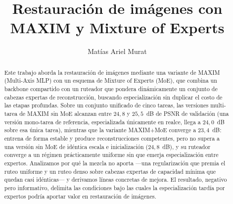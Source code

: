 \documentclass[aps,prl,twocolumn,groupedaddress]{revtex4-2}
\begin{document}

\title{
Restauración de imágenes con MAXIM y Mixture of Experts
}


\author{Matías Ariel Murat}



\begin{abstract}
Este trabajo aborda la restauración de imágenes mediante una variante de MAXIM (Multi-Axis MLP) con un esquema de Mixture of Experts (MoE), que combina un backbone compartido con un ruteador que pondera dinámicamente un conjunto de cabezas expertas de reconstrucción, buscando especialización sin duplicar el costo de las etapas profundas. Sobre un conjunto unificado de cinco tareas, las versiones multi-tarea de MAXIM sin MoE alcanzan entre $24{,}8$ y $25{,}5$~dB de PSNR de validación (una versión mono-tarea de referencia, especializada únicamente en realce, llega a $24{,}0$~dB sobre esa única tarea), mientras que la variante MAXIM+MoE converge a $23{,}4$~dB: entrena de forma estable y produce reconstrucciones competentes, pero no supera a una versión sin MoE de idéntica escala e inicialización ($24{,}8$~dB), y su ruteador converge a un régimen prácticamente uniforme sin que emerja especialización entre expertos. Analizamos por qué la mezcla no aporta ---una regularización que premia el ruteo uniforme y un ruteo denso sobre cabezas expertas de capacidad mínima que quedan casi idénticas--- y derivamos líneas concretas de mejora. El resultado, negativo pero informativo, delimita las condiciones bajo las cuales la especialización tardía por expertos podría aportar valor en restauración de imágenes.
\end{abstract}
\end{document}
